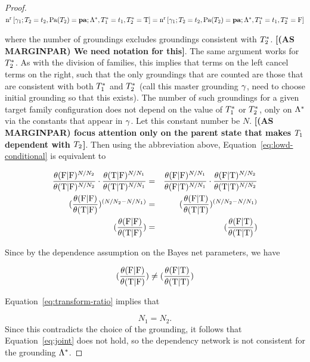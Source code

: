 \documentclass[runningheads,a4paper]{llncs}
\renewcommand{\marginpar}[1]{\fixneeded{(AS MARGINPAR) #1}}
\newcommand{\fixneeded}[1]{\textbf{[\footnotesize #1]}}
\begin{document}
\begin{proof}
$\mathrm{n}^{\mathrm{r}}\left[\gamma_{1};T_{2}  = t_{2}, \mathrm{Pa}(T_{2}) = \mathbf{pa};\Lambda^{*}\hspace{0.0ex},T_{1}^{*}\hspace{0.0ex} = t_{1},T_{2}^{*}\hspace{0.0ex} = \mathrm{T}\right] = \mathrm{n}^{\mathrm{r}}\left[\gamma_{1};T_{2}  = t_{2}, \mathrm{Pa}(T_{2}) = \mathbf{pa};\Lambda^{*}\hspace{0.0ex},T_{1}^{*}\hspace{0.0ex} = t_{1},T_{2}^{*}\hspace{0.0ex} = \mathrm{F}\right]$

where the number of groundings excludes groundings consistent with $T_{2}^{*}\hspace{0.0ex}$. \marginpar{We need notation for this}. The same argument works for $T_{2}^{*}\hspace{0.0ex}$. As with the division of families, this implies that terms on the left cancel terms on the right, such that the only groundings that are counted are those that are consistent with both  $T_{1}^{*}\hspace{0.0ex}$ and $T_{2}^{*}\hspace{0.0ex}$ (call this master grounding $\gamma$, need to choose initial grounding so that this exists). The number of such groundings for a given target family configuration does not depend on the value of $T_{1}^{*}\hspace{0.0ex}$ or $T_{2}^{*}\hspace{0.0ex}$, only on $\Lambda^{*}\hspace{0.0ex}$ via the constants that appear in $\gamma$. Let this constant number be $N$. \marginpar{focus attention only on the parent state that makes $T_{1}$ dependent with $T_{2}$}. Then using the abbreviation above, Equation~\eqref{eq:lowd-conditional} is equivalent to

\begin{eqnarray}
\frac{\theta(\mathrm{F}|\mathrm{F})^{N/N_{2}}}{\theta(\mathrm{T}|\mathrm{F})^{N/N_{2}} }  \cdot \frac{\theta(\mathrm{T}|\mathrm{F})^{N/N_{1}} }{\theta(\mathrm{T}|\mathrm{T})^{N/N_{1}} }  & = & \frac{\theta(\mathrm{F}|\mathrm{F})^{N/N_{1}} }{\theta(\mathrm{F}|\mathrm{T})^{N/N_{1}} }  \cdot \frac{\theta(\mathrm{F}|\mathrm{T})^{N/N_{2}} }{\theta(\mathrm{T}|\mathrm{T})^{N/N_{2}} } \\
(\frac{\theta(\mathrm{F}|\mathrm{F})}{\theta(\mathrm{T}|\mathrm{F}) })^{\left(N/N_{2}-N/N_{1}\right)}   & = &  (\frac{\theta(\mathrm{F}|\mathrm{T}) }{\theta(\mathrm{T}|\mathrm{T})})^{\left(N/N_{2}-N/N_{1}\right)} \label{eq:transform-ratio}\\
(\frac{\theta(\mathrm{F}|\mathrm{F})}{\theta(\mathrm{T}|\mathrm{F}) })   & = &  (\frac{\theta(\mathrm{F}|\mathrm{T}) }{\theta(\mathrm{T}|\mathrm{T})})
\end{eqnarray}

Since by the dependence assumption on the Bayes net parameters, we have

$$(\frac{\theta(\mathrm{F}|\mathrm{F})}{\theta(\mathrm{T}|\mathrm{F}) })   \neq  (\frac{\theta(\mathrm{F}|\mathrm{T}) }{\theta(\mathrm{T}|\mathrm{T})})$$

Equation~\ref{eq:transform-ratio} implies that 

$$N_{1} = N_{2}. $$ Since this contradicts the choice of the grounding, it follows that Equation~\ref{eq:joint} does not hold, so the dependency network is not consistent for the grounding $\Lambda^{*}\hspace{0.0ex}$.
 \end{proof}





\end{document}
